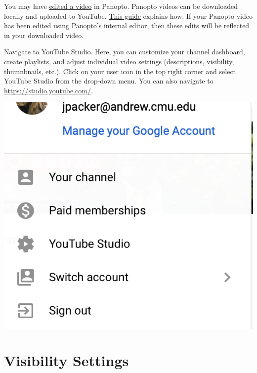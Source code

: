 \begin{note}
    You may have \href{sec:panopto:editing_videos}{edited a video} in Panopto.
    Panopto videos can be downloaded locally and uploaded to YouTube.
    \href{https://www.panopto.com/blog/how-to-upload-a-panopto-video-to-youtube/}{This guide} explains how.
    If your Panopto video has been edited using Panopto's internal editor, then these edits will be reflected in your downloaded video.
\end{note}

\begin{gram}
    Navigate to YouTube Studio.
    Here, you can customize your channel dashboard, create playlists, and adjust individual video settings (descriptions, visibility, thumnbnails, etc.).
    Click on your user icon in the top right corner and select YouTube Studio from the drop-down menu.
    You can also navigate to \href{https://studio.youtube.com/}{https://studio.youtube.com/}.

    {
        \centering
        \includegraphics[scale=0.4]{youtube/media/09-youtube-studio.png}
    }
\end{gram}


\section{Visibility Settings}
\label{sec:youtube:visibility settings}

